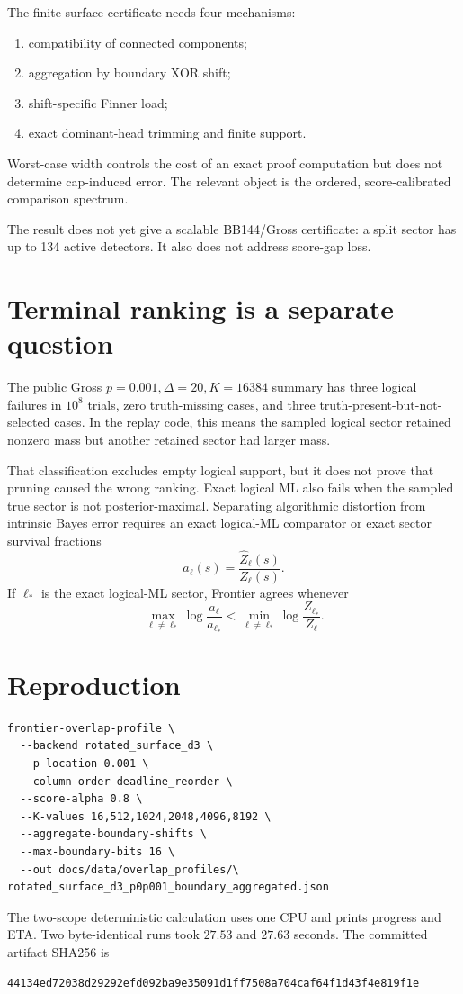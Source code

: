 \documentclass[11pt]{article}
\newcommand{\1}{\mathbf 1}
\begin{document}
The finite surface certificate needs four mechanisms:
\begin{enumerate}
\item compatibility of connected components;
\item aggregation by boundary XOR shift;
\item shift-specific Finner load;
\item exact dominant-head trimming and finite support.
\end{enumerate}
Worst-case width controls the cost of an exact proof computation but does
not determine cap-induced error.  The relevant object is the ordered,
score-calibrated comparison spectrum.

The result does not yet give a scalable BB144/Gross certificate: a split
sector has up to 134 active detectors.  It also does not address score-gap
loss.

\section{Terminal ranking is a separate question}

The public Gross \(p=0.001,\Delta=20,K=16384\) summary has three logical
failures in \(10^8\) trials, zero truth-missing cases, and three
truth-present-but-not-selected cases.  In the replay code, this means the
sampled logical sector retained nonzero mass but another retained sector had
larger mass.

That classification excludes empty logical support, but it does not prove
that pruning caused the wrong ranking.  Exact logical ML also fails when the
sampled true sector is not posterior-maximal.  Separating algorithmic
distortion from intrinsic Bayes error requires an exact logical-ML
comparator or exact sector survival fractions
\[
 a_\ell(s)=\frac{\widehat Z_\ell(s)}{Z_\ell(s)}.
\]
If \(\ell_*\) is the exact logical-ML sector, Frontier agrees whenever
\[
 \max_{\ell\ne\ell_*}\log\frac{a_\ell}{a_{\ell_*}}
 <
 \min_{\ell\ne\ell_*}\log\frac{Z_{\ell_*}}{Z_\ell}.
\]

\section{Reproduction}

\begin{verbatim}
frontier-overlap-profile \
  --backend rotated_surface_d3 \
  --p-location 0.001 \
  --column-order deadline_reorder \
  --score-alpha 0.8 \
  --K-values 16,512,1024,2048,4096,8192 \
  --aggregate-boundary-shifts \
  --max-boundary-bits 16 \
  --out docs/data/overlap_profiles/\
rotated_surface_d3_p0p001_boundary_aggregated.json
\end{verbatim}

The two-scope deterministic calculation uses one CPU and prints progress and
ETA.  Two byte-identical runs took \(27.53\) and \(27.63\) seconds.  The
committed artifact SHA256 is
\begin{verbatim}
44134ed72038d29292efd092ba9e35091d1ff7508a704caf64f1d43f4e819f1e
\end{verbatim}
\end{document}
